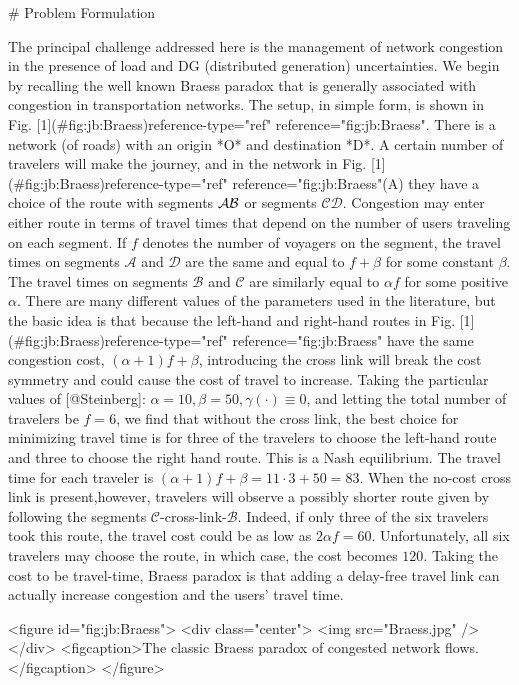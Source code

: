 # Problem Formulation

The principal challenge addressed here is the management of network congestion in the presence of load and DG (distributed generation) uncertainties. We begin by recalling the well known Braess paradox that is generally associated with congestion in transportation networks. The setup, in simple form, is shown in Fig. [1](#fig:jb:Braess){reference-type="ref" reference="fig:jb:Braess"}. There is a network (of roads) with an origin *O* and destination *D*. A certain number of travelers will make the journey, and in the network in Fig. [1](#fig:jb:Braess){reference-type="ref" reference="fig:jb:Braess"}(A) they have a choice of the route with segments $\Large\mathcal{AB}$ or segments $\mathcal{ CD}$. Congestion may enter either route in terms of travel times that depend on the number of users traveling on each segment. If $f$ denotes the number of voyagers on the segment, the travel times on segments ${\mathcal A}$ and ${\mathcal D}$ are the same and equal to $f+\beta$ for some constant $\beta$. The travel times on segments ${\mathcal B}$ and ${\mathcal C}$ are similarly equal to $\alpha f$ for some positive $\alpha$. There are many different values of the parameters used in the literature, but the basic idea is that because the left-hand and right-hand routes in Fig. [1](#fig:jb:Braess){reference-type="ref" reference="fig:jb:Braess"} have the same congestion cost, $(\alpha+1)f+\beta$, introducing the cross link will break the cost symmetry and could cause the cost of travel to increase. Taking the particular values of [@Steinberg]: $\alpha=10,\beta=50,\gamma(\cdot)\equiv 0$, and letting the total number of travelers be $f=6$, we find that without the cross link, the best choice for minimizing travel time is for three of the travelers to choose the left-hand route and three to choose the right hand route. This is a Nash equilibrium. The travel time for each traveler is $(\alpha + 1)f+\beta= 11\cdot 3+50=83$. When the no-cost cross link is present,however, travelers will observe a possibly shorter route given by following the segments ${\mathcal C}$-cross-link-${\mathcal B}$. Indeed, if only three of the six travelers took this route, the travel cost could be as low as $2\alpha f=60$. Unfortunately, all six travelers may choose the route, in which case, the cost becomes $120$. Taking the cost to be travel-time, Braess paradox is that adding a delay-free travel link can actually increase congestion and the users' travel time.

<figure id="fig:jb:Braess"> <div class="center"> <img src="Braess.jpg" /> </div> <figcaption>The classic Braess paradox of congested network flows.</figcaption> </figure>

